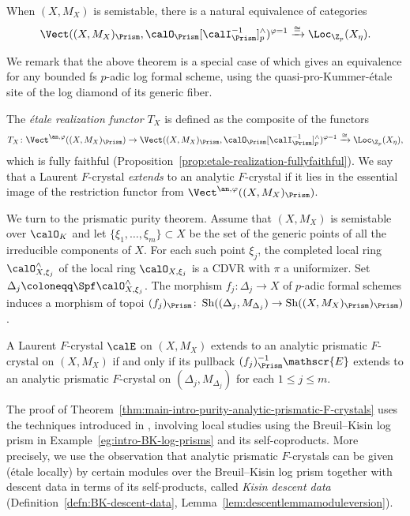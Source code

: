 \begin{thm}
When $(X,M_X)$ is semistable, there is a natural equivalence of categories  
\[
\Vect((X,M_X)_\Prism,\calO_\Prism[\calI_\Prism^{-1}]^\wedge_p)^{\varphi=1}\xrightarrow{\cong} \Loc_{\Z_p}(X_\eta).
\]  
\end{thm}

\noindent We remark that the above theorem is a special case of \cite[Thm.~7.36]{koshikawa-yao} which gives an equivalence for any bounded fs $p$-adic log formal scheme, using the quasi-pro-Kummer-\'etale site of the log diamond of its generic fiber. 

The \emph{\'etale realization functor} $T_X$ is defined as the composite of the functors 
\[
T_X\colon\Vect^{\an,\varphi}((X,M_X)_\Prism)\rightarrow \Vect((X,M_X)_\Prism,\calO_\Prism[\calI_\Prism^{-1}]^\wedge_p)^{\varphi=1} \xrightarrow{\cong} \Loc_{\Z_p}(X_\eta),
\]
which is fully faithful (Proposition~\ref{prop:etale-realization-fullyfaithful}). We say that a Laurent $F$-crystal \emph{extends} to an analytic $F$-crystal if it lies in the essential image of the restriction functor from $\Vect^{\an,\varphi}((X,M_X)_\Prism)$.


We turn to the prismatic purity theorem. Assume that $(X,M_X)$ is semistable over $\calO_K$ and let $\{\xi_1,\ldots,\xi_m\}\subset X$ be the set of the generic points of all the irreducible components of $X$. For each such point $\xi_j$, the completed local ring $\calO_{X,\xi_j}^\wedge$ of the local ring $\calO_{X,\xi_j}$ is a CDVR with $\pi$ a uniformizer. Set $\Delta_j\coloneqq \Spf \calO_{X,\xi_j}^\wedge$. The morphism $f_j\colon \Delta_j\rightarrow X$ of $p$-adic formal schemes induces a morphism of topoi $(f_j)_\Prism\colon \operatorname{Sh}((\Delta_j,M_{\Delta_j})\rightarrow \operatorname{Sh}((X,M_X)_\Prism)_\Prism)$.

\begin{thm} \label{thm:main-intro-purity-analytic-prismatic-F-crystals}
A Laurent $F$-crystal $\calE$ on $(X,M_X)$ extends to an analytic prismatic $F$-crystal on $(X,M_X)$ if and only if its pullback $(f_j)_\Prism^{-1}\mathscr{E}$ extends to an analytic prismatic $F$-crystal on $(\Delta_j,M_{\Delta_j})$ for each $1\leq j\leq m$.
\end{thm}

The proof of Theorem~\ref{thm:main-intro-purity-analytic-prismatic-F-crystals} uses the techniques introduced in \cite{du-liu-prismaticphiGhatmodule, du-liu-moon-shimizu-completed-prismatic-F-crystal-loc-system}, involving local studies using the Breuil--Kisin log prism in Example~\ref{eg:intro-BK-log-prisms} and its self-coproducts. More precisely, we use the observation that analytic prismatic $F$-crystals can be given (\'etale locally) by certain modules over the Breuil--Kisin log prism together with descent data in terms of its self-products, called \textit{Kisin descent data} (Definition~\ref{defn:BK-descent-data}, Lemma~\ref{lem:descentlemmamoduleversion}). 

